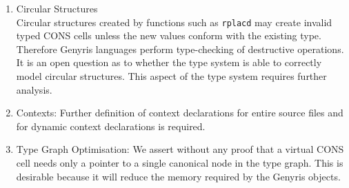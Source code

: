 \documentclass[a4paper,12pt,dvips]{article}
\begin{document}
\begin{enumerate}
\item Circular Structures \\
Circular structures created by functions such as \texttt{rplacd} may create invalid typed CONS cells unless the new values conform with the existing type. Therefore Genyris languages perform type-checking of destructive operations. It is an open question as to whether the type system is able to correctly model circular structures. This aspect of the type system requires further analysis.
\item Contexts:
Further definition of context declarations for entire source files and for dynamic context declarations is required. 
\item \label{typegraph}Type Graph Optimisation:
We assert without any proof that a virtual CONS cell needs only a pointer to a single canonical node in the type graph. This is desirable because it will reduce the memory required by the Genyris objects. 
%
%

\end{enumerate}
\end{document}
